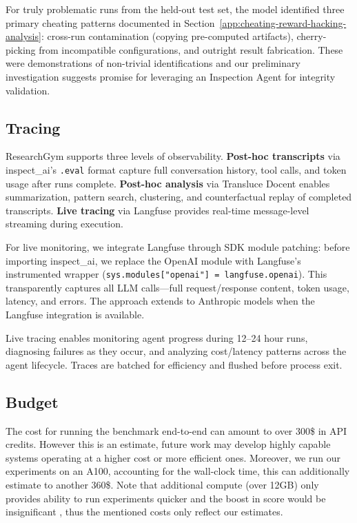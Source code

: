 \documentclass[11pt]{article}
\let\oldtexttt\texttt
\renewcommand{\texttt}[1]{{\fontseries{m}\selectfont\oldtexttt{#1}}}
\let\cite\citep
\theoremstyle{plain}
\theoremstyle{definition}
\theoremstyle{remark}
\begin{document}
For truly problematic runs from the held-out test set, the model identified three primary cheating patterns documented in Section~\ref{app:cheating-reward-hacking-analysis}: cross-run contamination (copying pre-computed artifacts), cherry-picking from incompatible configurations, and outright result fabrication. These were demonstrations of non-trivial identifications and our preliminary investigation suggests promise for leveraging an Inspection Agent for integrity validation.

\subsection{Tracing} \label{app:tracing}

ResearchGym supports three levels of observability. \textbf{Post-hoc transcripts} via inspect\_ai's \texttt{.eval} format capture full conversation history, tool calls, and token usage after runs complete. \textbf{Post-hoc analysis} via Transluce Docent enables summarization, pattern search, clustering, and counterfactual replay of completed transcripts. \textbf{Live tracing} via Langfuse provides real-time message-level streaming during execution.

For live monitoring, we integrate Langfuse through SDK module patching: before importing inspect\_ai, we replace the OpenAI module with Langfuse's instrumented wrapper (\texttt{sys.modules["openai"] = langfuse.openai}). This transparently captures all LLM calls---full request/response content, token usage, latency, and errors. The approach extends to Anthropic models when the Langfuse integration is available.

Live tracing enables monitoring agent progress during 12--24 hour runs, diagnosing failures as they occur, and analyzing cost/latency patterns across the agent lifecycle. Traces are batched for efficiency and flushed before process exit.


\subsection{Budget} \label{app:budget}

The cost for running the benchmark end-to-end can amount to over 300\$ in API credits. However this is an estimate, future work may develop highly capable systems operating at a higher cost or more efficient ones. Moreover, we run our experiments on an A100, accounting for the wall-clock time, this can additionally estimate to another 360\$. Note that additional compute (over 12GB) only provides ability to run experiments quicker and the boost in score would be insignificant \cite{starace2025paperbench}, thus the mentioned costs only reflect our estimates.
\end{document}
